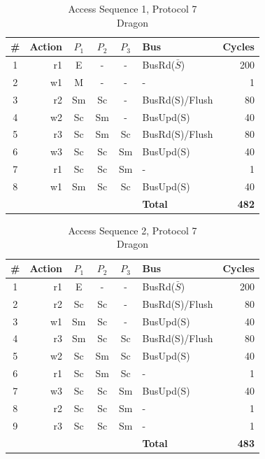 \documentclass[12pt, letterpaper]{report}
\begin{document}
\begin{table}[H]
	\setlength{\extrarowheight}{.5ex}
	\centering
	\begin{tabular}{ |c|r|c|c|c|l|r| }
		\hline
		\textbf{\#} & \textbf{Action} & \textbf{$P_1$} & \textbf{$P_{2}$} & \textbf{$P_3$} & \textbf{Bus} & \textbf{Cycles} \\
		\hline
		1 & r1 & E & - & - & BusRd($\bar{S}$) & 200 \\
		\hline
		2 & w1 & M & - & - & - & 1 \\
		\hline
		3 & r2 & Sm & Sc & - & BusRd(S)/Flush & 80 \\
		\hline
		4 & w2 & Sc & Sm & - & BusUpd(S) & 40 \\
		\hline
		5 & r3 & Sc & Sm & Sc & BusRd(S)/Flush & 80 \\
		\hline
		6 & w3 & Sc & Sc & Sm & BusUpd(S) & 40 \\
		\hline
		7 & r1 & Sc & Sc & Sm & - & 1 \\
		\hline
		8 & w1 & Sm & Sc & Sc & BusUpd(S) & 40 \\
		\hline \hline \hline
		\cellcolor{null} & \cellcolor{null} & \cellcolor{null} & \cellcolor{null} & \cellcolor{null} & \textbf{Total} & \textbf{482} \\
		\hline
	\end{tabular}
	\caption{Access Sequence 1, Protocol 7\\Dragon}
\end{table}


\begin{table}[H]
	\setlength{\extrarowheight}{.5ex}
	\centering
	\begin{tabular}{ |c|r|c|c|c|l|r| }
		\hline
		\textbf{\#} & \textbf{Action} & \textbf{$P_1$} & \textbf{$P_{2}$} & \textbf{$P_3$} & \textbf{Bus} & \textbf{Cycles} \\
		\hline
		1 & r1 & E & - & - & BusRd($\bar{S}$) & 200 \\
		\hline
		2 & r2 & Sc & Sc & - & BusRd(S)/Flush & 80 \\
		\hline
		3 & w1 & Sm & Sc & - & BusUpd(S) & 40 \\
		\hline
		4 & r3 & Sm & Sc & Sc & BusRd(S)/Flush & 80 \\
		\hline
		5 & w2 & Sc & Sm & Sc & BusUpd(S) & 40 \\
		\hline
		6 & r1 & Sc & Sm & Sc & - & 1 \\
		\hline
		7 & w3 & Sc & Sc & Sm & BusUpd(S) & 40 \\
		\hline
		8 & r2 & Sc & Sc & Sm & - & 1 \\
		\hline
		9 & r3 & Sc & Sc & Sm & - & 1 \\
		\hline \hline \hline
		\cellcolor{null} & \cellcolor{null} & \cellcolor{null} & \cellcolor{null} & \cellcolor{null} & \textbf{Total} & \textbf{483} \\
		\hline
	\end{tabular}
	\caption{Access Sequence 2, Protocol 7\\Dragon}
\end{table}
\end{document}

